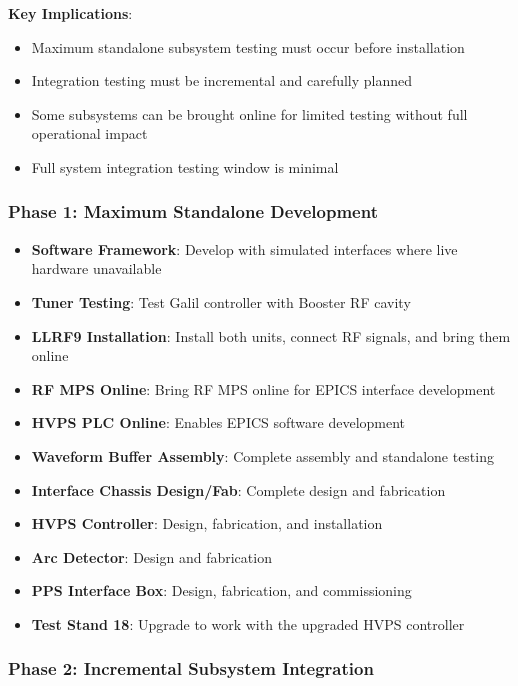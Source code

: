 \textbf{Key Implications}:

\begin{itemize}
\tightlist
\item
  Maximum standalone subsystem testing must occur before installation
\item
  Integration testing must be incremental and carefully planned
\item
  Some subsystems can be brought online for limited testing without full operational impact
\item
  Full system integration testing window is minimal
\end{itemize}

\subsubsection{Phase 1: Maximum Standalone Development}\label{phase-1-maximum-standalone-development}

\begin{itemize}
\tightlist
\item
  \textbf{Software Framework}: Develop with simulated interfaces where live hardware unavailable
\item
  \textbf{Tuner Testing}: Test Galil controller with Booster RF cavity
\item
  \textbf{LLRF9 Installation}: Install both units, connect RF signals, and bring them online
\item
  \textbf{RF MPS Online}: Bring RF MPS online for EPICS interface development
\item
  \textbf{HVPS PLC Online}: Enables EPICS software development
\item
  \textbf{Waveform Buffer Assembly}: Complete assembly and standalone testing
\item
  \textbf{Interface Chassis Design/Fab}: Complete design and fabrication
\item
  \textbf{HVPS Controller}: Design, fabrication, and installation
\item
  \textbf{Arc Detector}: Design and fabrication
\item
  \textbf{PPS Interface Box}: Design, fabrication, and commissioning
\item
  \textbf{Test Stand 18}: Upgrade to work with the upgraded HVPS controller
\end{itemize}

\subsubsection{Phase 2: Incremental Subsystem Integration}\label{phase-2-incremental-subsystem-integration}


